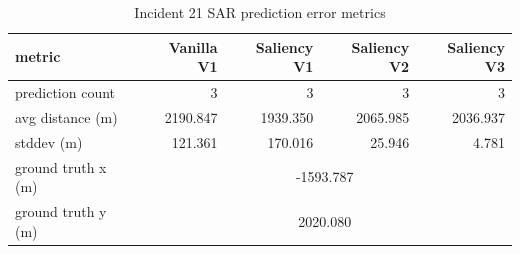 \begin{table}[ht]
\centering
\caption{Incident 21 SAR prediction error metrics}
\label{tab:sar-incident-21}
\begin{tabular}{lrrrr}
\hline
metric & Vanilla V1 & Saliency V1 & Saliency V2 & Saliency V3 \\
\hline
prediction count & 3 & 3 & 3 & 3 \\
avg distance (m) & 2190.847 & 1939.350 & 2065.985 & 2036.937 \\
stddev (m) & 121.361 & 170.016 & 25.946 & 4.781 \\
ground truth x (m) & \multicolumn{4}{c}{-1593.787} \\
ground truth y (m) & \multicolumn{4}{c}{2020.080} \\
\hline
\end{tabular}
\end{table}
